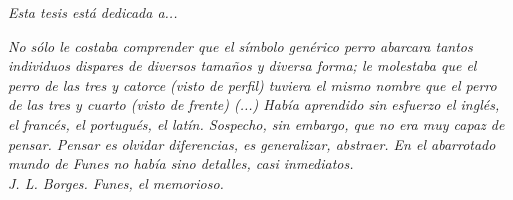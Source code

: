 \thispagestyle{empty}
\begin{flushright}
\textit{Esta tesis está dedicada a...}
\end{flushright}

\newpage
\thispagestyle{empty}
\begin{flushright}
\textit{No sólo le costaba comprender que el símbolo genérico \textit{perro} abarcara tantos individuos dispares de diversos tamaños y diversa forma; le molestaba que el perro de las tres y catorce (visto de perfil) tuviera el mismo nombre que el perro de las tres y cuarto (visto de frente) (...) Había aprendido sin esfuerzo el inglés, el francés, el portugués, el latín. Sospecho, sin embargo, que no era muy capaz de pensar. Pensar es olvidar diferencias, es generalizar, abstraer. En el abarrotado mundo de Funes no había sino detalles, casi inmediatos.
\\
\medskip
J. L. Borges. Funes, el memorioso.~\cite{funes}
}
\end{flushright}